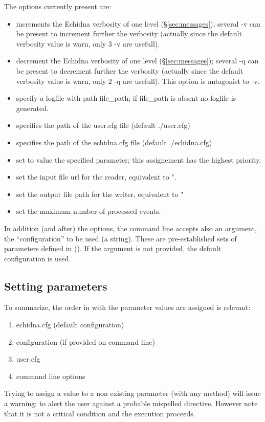 The options currently present are:
\begin{itemize}
\item {} increments the Echidna verbosity of one level (\S\ref{sec:messages}); several -v can be
present to increment further the verbosity (actually since the default verbosity value is warn, only
3 -v are usefull).
\item {} decrement the Echidna verbosity of one level (\S\ref{sec:messages}); several -q can be
present to decrement further the verbosity (actually since the default verbosity value is warn, only
2 -q are usefull). This option is antagonist to -v.
\item {} specify a logfile with path {\code file\_path}; if file\_path is absent no
logfile is generated.
\item {} specifies the path of the user.cfg file (default ./user.cfg)
\item {} specifies the path of the echidna.cfg file (default ./echidna.cfg)
\item {} set to value the specified parameter; this assignement has the highest
priority.
\item {} set the input file url for the reader, equivalent to ".
\item {} set the output file path for the writer, equivalent to "
\item {} set the maximum number of processed events.
\end{itemize}

In addition (and after) the options, the command line accepts also an argument, the ``configuration'' to be used (a string).
These are pre-established sets of parameters defined in  ().
If the argument is not provided, the default configuration is used.

\subsection{Setting parameters}
\label{sec:custom_param}

To summarize, the order in with the parameter values are assigned is relevant:
\begin{enumerate}
\item echidna.cfg (default configuration)
\item configuration (if provided on command line)
\item user.cfg
\item command line options
\end{enumerate}

Trying to assign a value to a non existing parameter (with any method) will issue a warning: 
to alert the user against a probable mispelled directive. 
However note that it is not a critical condition and the execution proceeds.

